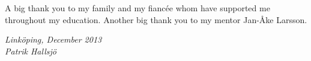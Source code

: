\begin{acknowledgments}
A big thank you to my family and my fiancée whom have supported me throughout my education.
Another big thank you to my mentor Jan-Åke Larsson.

  \addvspace{1em}
  \begin{flushright}
    \textit{%
      Linköping, December 2013\\
      Patrik Hallsjö%
    }
  \end{flushright}
\end{acknowledgments}
